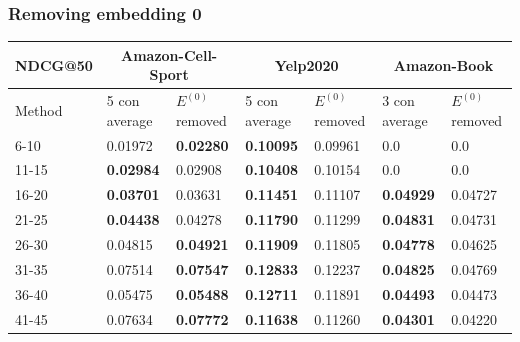 \subsubsection{Removing embedding 0}
\begin{table}[h!]
    \centering
    \begin{tabular}{|l|l|l||l|l||l|l|}
        \hline
        NDCG@50   & \multicolumn{2}{c||}{Amazon-Cell-Sport} & \multicolumn{2}{c||}{Yelp2020} & \multicolumn{2}{c|}{Amazon-Book}                                                            \\ \hline
        Method    & 5 con average                           & $E^{(0)}$ removed              & 5 con average                    & $E^{(0)}$ removed & 3 con average    & $E^{(0)}$ removed \\ \hline
        6-10      & 0.01972                                 & \textbf{0.02280}               & \textbf{0.10095}                 & 0.09961           & 0.0              & 0.0               \\ \hline
        11-15     & \textbf{0.02984}                        & 0.02908                        & \textbf{0.10408}                 & 0.10154           & 0.0              & 0.0               \\ \hline
        16-20     & \textbf{0.03701}                        & 0.03631                        & \textbf{0.11451}                 & 0.11107           & \textbf{0.04929} & 0.04727           \\ \hline
        21-25     & \textbf{0.04438}                        & 0.04278                        & \textbf{0.11790}                 & 0.11299           & \textbf{0.04831} & 0.04731           \\ \hline
        26-30     & 0.04815                                 & \textbf{0.04921}               & \textbf{0.11909}                 & 0.11805           & \textbf{0.04778} & 0.04625           \\ \hline
        31-35     & 0.07514                                 & \textbf{0.07547}               & \textbf{0.12833}                 & 0.12237           & \textbf{0.04825} & 0.04769           \\ \hline
        36-40     & 0.05475                                 & \textbf{0.05488}               & \textbf{0.12711}                 & 0.11891           & \textbf{0.04493} & 0.04473           \\ \hline
        41-45     & 0.07634                                 & \textbf{0.07772}               & \textbf{0.11638}                 & 0.11260           & \textbf{0.04301} & 0.04220           \\ \hline

\end{tabular}
\end{table}
